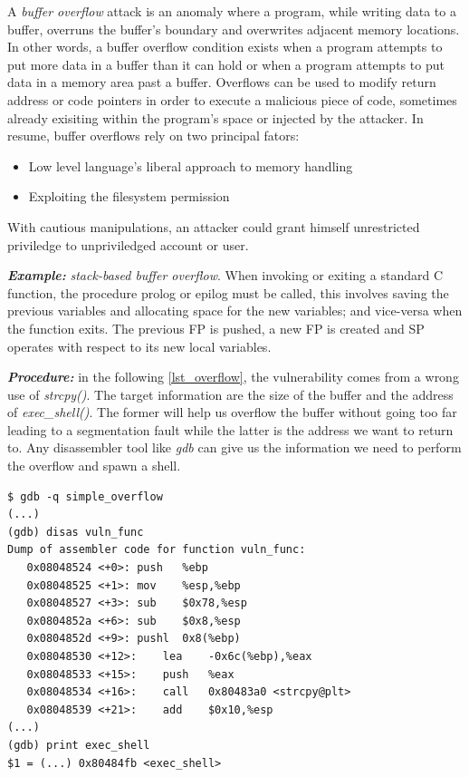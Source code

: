 \documentclass[10pt,twocolumn]{article}
\begin{document}


A \textit{buffer overflow} attack is an anomaly where a
program, while writing data to a buffer, overruns the buffer's boundary and
overwrites adjacent memory locations. In other words, a buffer overflow condition exists when a program attempts to put more data in a buffer than it can
hold or when a program attempts to put data in a memory area past a
buffer. Overflows can be used to modify return address or code pointers in order
to execute a malicious piece of code, sometimes already exisiting within the
program's space or injected by the attacker. In resume, buffer overflows rely
on two principal fators: 

\begin{itemize}
    \item Low level language's liberal approach to memory handling
    \item Exploiting the filesystem permission
\end{itemize}

With cautious manipulations, an attacker could grant himself unrestricted
priviledge to unpriviledged account or user.

\textbf{\textit{Example:}} \textit{stack-based buffer
overflow}\cite{one_stacksmashing_1996}. When invoking or exiting a standard C
function, the procedure prolog or epilog must be called, this involves saving
the previous variables and allocating space for the new variables; and
vice-versa when the function exits. The previous FP is pushed, a new FP is
created and SP operates with respect to its new local variables.

\textbf{\textit{Procedure:}} in the following \autoref{lst_overflow},
the vulnerability comes from a wrong use of \textit{strcpy()}. The target
information are the size of the buffer and the address of
\textit{exec\_shell()}. The
former will help us overflow the buffer without going too far leading to a
segmentation fault while the latter is the address we want to return to. Any disassembler tool like \textit{gdb} can give us the
information we need to perform the overflow and spawn a shell.

\begin{lstlisting}[aboveskip=\bigskipamount,belowskip=\medskipamount,caption=Gdb
output on simple\_overflow.c]
$ gdb -q simple_overflow
(...)
(gdb) disas vuln_func
Dump of assembler code for function vuln_func:
   0x08048524 <+0>:	push   %ebp
   0x08048525 <+1>:	mov    %esp,%ebp
   0x08048527 <+3>:	sub    $0x78,%esp
   0x0804852a <+6>:	sub    $0x8,%esp
   0x0804852d <+9>:	pushl  0x8(%ebp)
   0x08048530 <+12>:	lea    -0x6c(%ebp),%eax
   0x08048533 <+15>:	push   %eax
   0x08048534 <+16>:	call   0x80483a0 <strcpy@plt>
   0x08048539 <+21>:	add    $0x10,%esp
(...)
(gdb) print exec_shell
$1 = (...) 0x80484fb <exec_shell>
\end{lstlisting}
\end{document}
